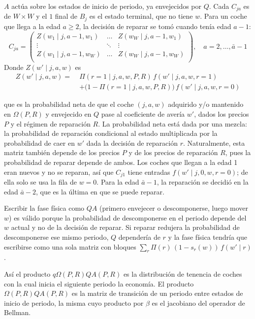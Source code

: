 \documentclass{article}
\begin{document}
$A$ actúa sobre los estados de inicio de periodo, ya envejecidos por $Q$. Cada $C_{ja}$ es de $W\times W$ y el $1$ final de $B_j$ es el estado terminal, que no tiene $w$. Para un coche que llega a la edad $a\ge 2$, la decisión de reparar se tomó cuando tenía edad $a-1$:
$$
C_{ja}=\begin{pmatrix}
   Z(w_1\mid j,a-1,w_1) & \dots & Z(w_W\mid j,a-1,w_1)\\
   \vdots & \ddots & \vdots\\
   Z(w_1\mid j,a-1,w_W) & \dots & Z(w_W\mid j,a-1,w_W)\\
\end{pmatrix},\quad a=2,\dots,\bar{a}-1
$$
Donde $Z(w'\mid j,a,w)$ es
$$\begin{aligned}
    Z(w'\mid j,a,w)=\;&\Pi(r=1\mid j,a,w, P, R)\,f(w'\mid j,a,w,r=1)\\
    &+\big(1-\Pi(r=1\mid j,a,w, P, R)\big)\,f(w'\mid j,a,w,r=0)
\end{aligned}$$

que es la probabilidad neta de que el coche $(j,a,w)$ adquirido y/o mantenido en $\Omega(P,R)$ y envejecido en $Q$ pase al coeficiente de avería $w'$, dados los precios $P$ y el régimen de reparación $R$. La probabilidad neta está dada por una mezcla: la probabilidad de reparación condicional al estado multiplicada por la probabilidad de caer en $w'$ dada la decisión de reparación $r$. Naturalmente, esta matriz también depende de los precios $P$ y de los precios de reparación $R$, pues la probabilidad de reparar depende de ambos. Los coches que llegan a la edad 1 eran nuevos y no se reparan, así que $C_{j1}$ tiene entradas $f(w'\mid j,0,w,r=0)$; de ella solo se usa la fila de $w=0$. Para la edad $\bar{a}-1$, la reparación se decidió en la edad $\bar{a}-2$, que es la última en que se puede reparar.

Escribir la fase física como $QA$ (primero envejecer o descomponerse, luego mover $w$) es válido porque la probabilidad de descomponerse en el periodo depende del $w$ actual y no de la decisión de reparar. Si reparar redujera la probabilidad de descomponerse ese mismo periodo, $Q$ dependería de $r$ y la fase física tendría que escribirse como una sola matriz con bloques $\sum_r \Pi(r)\,(1-s_r(w))\,f(w'\mid r)$.

Así el producto $q\Omega(P,R)QA(P,R)$ es la distribución de tenencia de coches con la cual inicia el siguiente periodo la economía. El producto $\Omega(P,R)QA(P,R)$ es la matriz de transición de un periodo entre estados de inicio de periodo, la misma cuyo producto por $\beta$ es el jacobiano del operador de Bellman.
\end{document}
